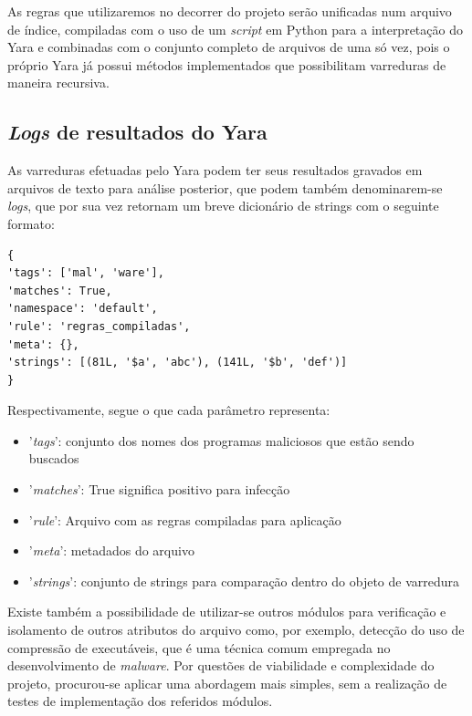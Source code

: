 As regras que utilizaremos no decorrer do projeto serão unificadas num arquivo
de índice, compiladas com o uso de um \textit{script} em Python para a
interpretação do Yara e combinadas com o conjunto completo de arquivos de uma só
vez, pois o próprio Yara já possui métodos implementados que possibilitam
varreduras de maneira recursiva.

\subsection{\textit{Logs} de resultados do Yara} %
\label{sub:logs_de_resultados_do_yara}

As varreduras efetuadas pelo Yara podem ter seus resultados gravados em arquivos
de texto para análise posterior, que podem também denominarem-se
\textit{logs}, que por sua vez retornam um  breve dicionário de strings com o seguinte
formato:

\begin{lstlisting}[caption=Conteúdo dos arquivos de resultado de varredura, label=resultyara]
{
'tags': ['mal', 'ware'],
'matches': True,
'namespace': 'default',
'rule': 'regras_compiladas',
'meta': {},
'strings': [(81L, '$a', 'abc'), (141L, '$b', 'def')]
}
\end{lstlisting}

Respectivamente, segue o que cada parâmetro representa:
\begin{itemize}
	\item '\textit{tags}': conjunto dos nomes dos programas maliciosos que estão sendo buscados

	\item '\textit{matches}': True significa positivo para infecção

	\item '\textit{rule}': Arquivo com as regras compiladas para aplicação

	\item '\textit{meta}': metadados do arquivo

	\item '\textit{strings}': conjunto de strings para comparação dentro do objeto de varredura
\end{itemize}

Existe também a possibilidade de utilizar-se outros módulos para verificação e
isolamento de outros atributos do arquivo como, por exemplo, detecção do uso de
compressão de executáveis, que é uma técnica comum empregada no desenvolvimento
de \textit{malware}. Por questões de viabilidade e complexidade do projeto,
procurou-se aplicar uma abordagem mais simples, sem a realização de testes de
implementação dos referidos módulos.

